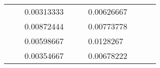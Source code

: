 \begin{table}[H]
\begin{tabular}{|cclcclccc}
\multicolumn{1}{|c|}{\cellcolor[HTML]{FFFFC7}}                                & \multicolumn{1}{c|}{\cellcolor[HTML]{DDFDFF}}                      & \multicolumn{1}{l|}{\cellcolor[HTML]{DAE8FC}0.00313333}  & \multicolumn{1}{c|}{\cellcolor[HTML]{FFFFC7}}                                & \multicolumn{1}{c|}{\cellcolor[HTML]{DDFDFF}}                       & \multicolumn{1}{l|}{\cellcolor[HTML]{DDFDFF}0.00626667}  &                                                                              &                                                                    &                                                          \\ \cline{3-3} \cline{6-6}
\multicolumn{1}{|c|}{\cellcolor[HTML]{FFFFC7}}                                & \multicolumn{1}{c|}{\cellcolor[HTML]{DDFDFF}}                      & \multicolumn{1}{l|}{\cellcolor[HTML]{DDFDFF}0.00872444}  & \multicolumn{1}{c|}{\cellcolor[HTML]{FFFFC7}}                                & \multicolumn{1}{c|}{\cellcolor[HTML]{DDFDFF}}                       & \multicolumn{1}{l|}{\cellcolor[HTML]{DAE8FC}0.00773778}  &                                                                              &                                                                    &                                                          \\ \cline{3-3} \cline{6-6}
\multicolumn{1}{|c|}{\cellcolor[HTML]{FFFFC7}}                                & \multicolumn{1}{c|}{\cellcolor[HTML]{DDFDFF}}                      & \multicolumn{1}{l|}{\cellcolor[HTML]{DAE8FC}0.00598667}  & \multicolumn{1}{c|}{\cellcolor[HTML]{FFFFC7}}                                & \multicolumn{1}{c|}{\cellcolor[HTML]{DDFDFF}}                       & \multicolumn{1}{l|}{\cellcolor[HTML]{DDFDFF}0.0128267}   &                                                                              &                                                                    &                                                          \\ \cline{3-3} \cline{6-6}
\multicolumn{1}{|c|}{\cellcolor[HTML]{FFFFC7}}                                & \multicolumn{1}{c|}{\cellcolor[HTML]{DDFDFF}}                      & \multicolumn{1}{l|}{\cellcolor[HTML]{DDFDFF}0.00354667}  & \multicolumn{1}{c|}{\cellcolor[HTML]{FFFFC7}}                                & \multicolumn{1}{c|}{\cellcolor[HTML]{DDFDFF}}                       & \multicolumn{1}{l|}{\cellcolor[HTML]{DAE8FC}0.00678222}  &                                                                              &                                                                    &                                                          \\ \cline{3-3} \cline{6-6}

\end{tabular}
\end{table}
